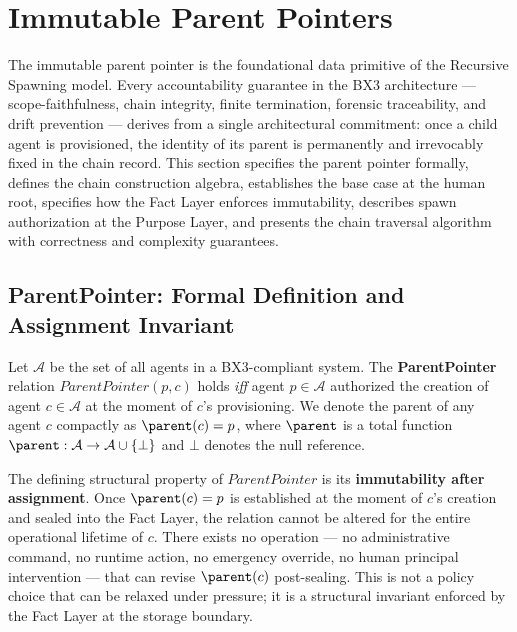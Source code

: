 \section{Immutable Parent Pointers}
\label{sec:immutable-parent-pointers}

The immutable parent pointer is the foundational data primitive of the Recursive Spawning model. Every accountability guarantee in the BX3 architecture — scope-faithfulness, chain integrity, finite termination, forensic traceability, and drift prevention — derives from a single architectural commitment: once a child agent is provisioned, the identity of its parent is permanently and irrevocably fixed in the chain record. This section specifies the parent pointer formally, defines the chain construction algebra, establishes the base case at the human root, specifies how the Fact Layer enforces immutability, describes spawn authorization at the Purpose Layer, and presents the chain traversal algorithm with correctness and complexity guarantees.

\subsection{ParentPointer: Formal Definition and Assignment Invariant}
\label{sec:parent-pointer-formal}

\begin{definition}[ParentPointer]
\label{def:parent_pointer}
Let $\mathcal{A}$ be the set of all agents in a BX3-compliant system. The \textbf{ParentPointer} relation $\textit{ParentPointer}(p, c)$ holds \emph{iff} agent $p \in \mathcal{A}$ authorized the creation of agent $c \in \mathcal{A}$ at the moment of $c$'s provisioning. We denote the parent of any agent $c$ compactly as $\parent(c) = p$, where $\parent$ is a total function $\parent : \mathcal{A} \to \mathcal{A} \cup \{\bot\}$ and $\bot$ denotes the null reference.
\end{definition}

The defining structural property of $\textit{ParentPointer}$ is its \textbf{immutability after assignment}. Once $\parent(c) = p$ is established at the moment of $c$'s creation and sealed into the Fact Layer, the relation cannot be altered for the entire operational lifetime of $c$. There exists no operation — no administrative command, no runtime action, no emergency override, no human principal intervention — that can revise $\parent(c)$ post-sealing. This is not a policy choice that can be relaxed under pressure; it is a structural invariant enforced by the Fact Layer at the storage boundary.

